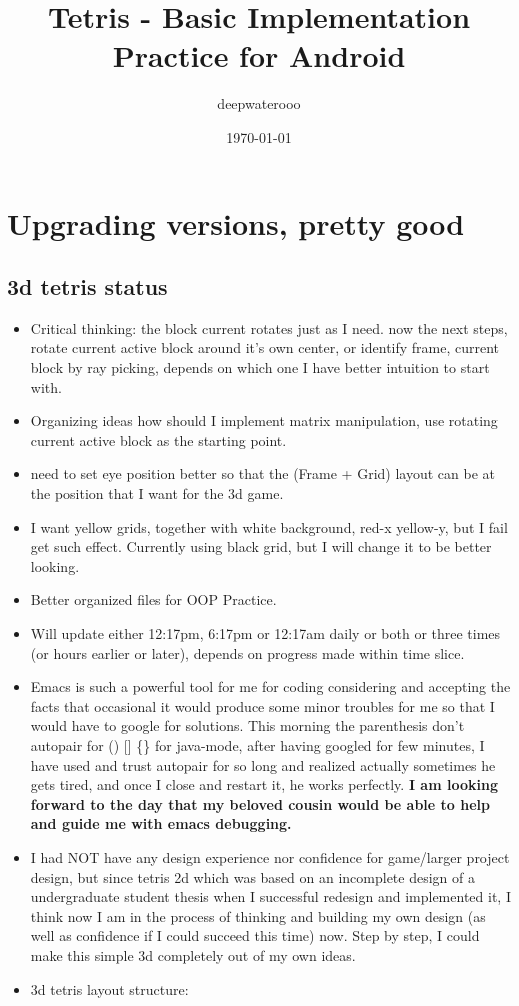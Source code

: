 \documentclass[9pt,b5paper]{article}
\author{deepwaterooo}
\date{\today}
\title{Tetris - Basic Implementation Practice for Android}
\begin{document}
\maketitle
\tableofcontents


\section{Upgrading versions, pretty good}
\label{sec-1}
\subsection{3d tetris status}
\label{sec-1-1}
\begin{itemize}
\item Critical thinking: the block current rotates just as I need. now the next steps, rotate current active block around it's own center, or identify frame, current block by ray picking, depends on which one I have better intuition to start with.
\item Organizing ideas how should I implement matrix manipulation, use rotating current active block as the starting point.
\item need to set eye position better so that the (Frame + Grid) layout can be at the position that I want for the 3d game.
\item I want yellow grids, together with white background, red-x yellow-y, but I fail get such effect. Currently using black grid, but I will change it to be better looking.
\item Better organized files for OOP Practice.
\item Will update either 12:17pm, 6:17pm or 12:17am daily or both or three times (or hours earlier or later), depends on progress made within time slice.
\item Emacs is such a powerful tool for me for coding considering and accepting the facts that occasional it would produce some minor troubles for me so that I would have to google for solutions. This morning the parenthesis don't autopair for () [] \{\} for java-mode, after having googled for few minutes, I have used and trust autopair for so long and realized actually sometimes he gets tired, and once I close and restart it, he works perfectly. \textbf{I am looking forward to the day that my beloved cousin would be able to help and guide me with emacs debugging.}
\item I had NOT have any design experience nor confidence for game/larger project design, but since tetris 2d which was based on an incomplete design of a undergraduate student thesis when I successful redesign and implemented it, I think now I am in the process of thinking and building my own design (as well as confidence if I could succeed this time) now. Step by step, I could make this simple 3d completely out of my own ideas.
\item 3d tetris layout structure: 


\end{itemize}
\end{document}
